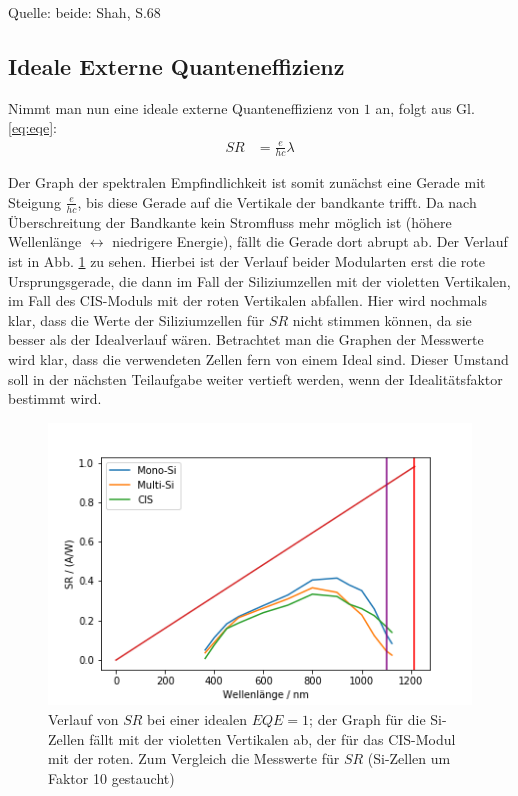Quelle: beide: Shah, S.68



\subsection{Ideale Externe Quanteneffizienz}

Nimmt man nun eine ideale externe Quanteneffizienz von $1$ an, folgt aus Gl. \ref{eq:eqe}:
\begin{align}
SR &= \frac{e}{hc}\lambda
\end{align}

Der Graph der spektralen Empfindlichkeit ist somit zunächst eine Gerade mit Steigung $\frac{e}{hc}$, bis diese Gerade auf die
Vertikale der bandkante trifft. Da nach Überschreitung der Bandkante kein Stromfluss mehr möglich ist (höhere Wellenlänge 
$\leftrightarrow$ niedrigere Energie), fällt die Gerade dort abrupt ab. Der Verlauf ist in Abb. \ref{bild:idealEQE} zu sehen.
Hierbei ist der Verlauf beider Modularten erst die rote Ursprungsgerade, die dann im Fall der Siliziumzellen mit der violetten
Vertikalen, im Fall des CIS-Moduls mit der roten Vertikalen abfallen.
Hier wird 
nochmals klar, dass die Werte der Siliziumzellen für $SR$ nicht stimmen können, da sie besser als der Idealverlauf wären.
Betrachtet man die Graphen der Messwerte wird klar, dass die verwendeten Zellen fern von einem Ideal sind. Dieser Umstand soll in der
nächsten Teilaufgabe weiter vertieft werden, wenn der Idealitätsfaktor bestimmt wird.

\begin{figure}[h]
    \centering
    \includegraphics[scale=0.75]{Bilder/32_ideal_EQE.png}
    \caption{Verlauf von $SR$ bei einer idealen $EQE = 1$; der Graph für die Si-Zellen fällt mit der violetten Vertikalen ab, der für
    das CIS-Modul mit der roten. Zum Vergleich die Messwerte für $SR$ (Si-Zellen um Faktor 10 gestaucht)}
    \label{bild:idealEQE}
\end{figure}

